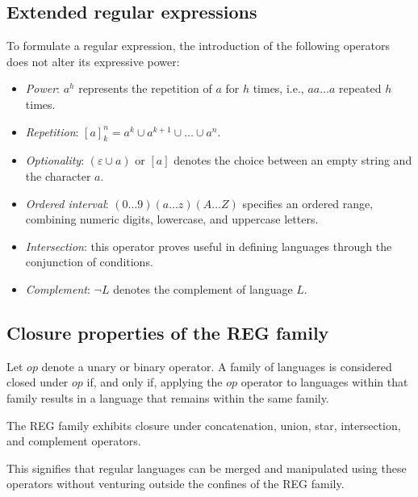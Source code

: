 \subsection{Extended regular expressions}
To formulate a regular expression, the introduction of the following operators does not alter its expressive power:
\begin{itemize}
    \item \textit{Power}: $a^h$ represents the repetition of $a$ for $h$ times, i.e., $aa\dots a$ repeated $h$ times.
    \item \textit{Repetition}: $[a]^n_k=a^k \cup a^{k+1} \cup \dots \cup a^n$.
    \item \textit{Optionality}: $(\varepsilon \cup a)$ or $[a]$ denotes the choice between an empty string and the character $a$.
    \item \textit{Ordered interval}: $(0\dots 9)(a \dots z)(A \dots Z)$ specifies an ordered range, combining numeric digits, lowercase, and uppercase letters.
    \item \textit{Intersection}: this operator proves useful in defining languages through the conjunction of conditions.
    \item \textit{Complement}: $\lnot L$ denotes the complement of language $L$.
\end{itemize}

\subsection{Closure properties of the REG family}
\begin{definition}
    Let $op$ denote a unary or binary operator.
    A family of languages is considered closed under $op$ if, and only if, applying the $op$ operator to languages within that family results in a language that remains within the same family.
\end{definition}
\begin{property}
    The REG family exhibits closure under concatenation, union, star, intersection, and complement operators.
\end{property}
This signifies that regular languages can be merged and manipulated using these operators without venturing outside the confines of the REG family.